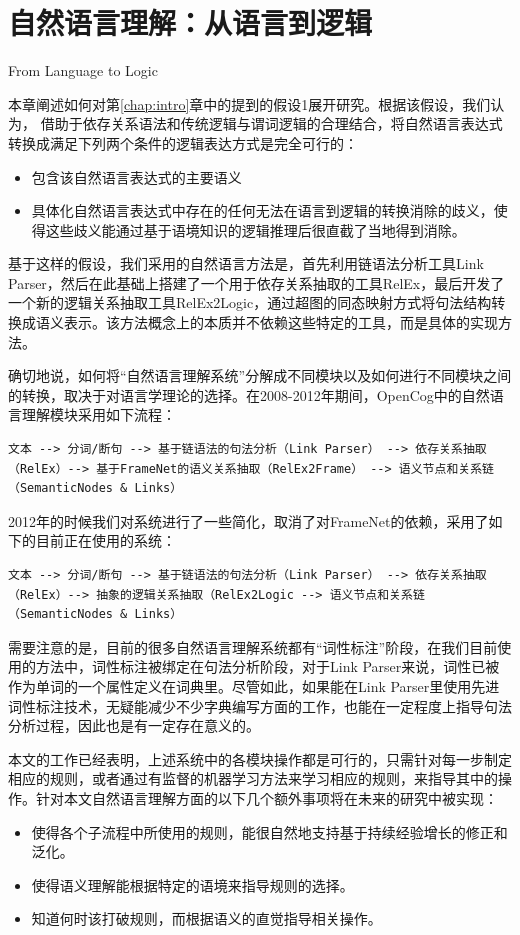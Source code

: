\chapter{自然语言理解：从语言到逻辑}{From Language to Logic}
\label{chap:comprehension}

本章阐述如何对第\ref{chap:intro}章中的提到的假设1展开研究。根据该假设，我们认为， 借助于依存关系语法和传统逻辑与谓词逻辑的合理结合，将自然语言表达式转换成满足下列两个条件的逻辑表达方式是完全可行的：
\begin{itemize}
\item 包含该自然语言表达式的主要语义
\item 具体化自然语言表达式中存在的任何无法在语言到逻辑的转换消除的歧义，使得这些歧义能通过基于语境知识的逻辑推理后很直截了当地得到消除。
\end{itemize}

基于这样的假设，我们采用的自然语言方法是，首先利用链语法分析工具Link Parser\cite{Sleator1993}，然后在此基础上搭建了一个用于依存关系抽取的工具RelEx，最后开发了一个新的逻辑关系抽取工具RelEx2Logic，通过超图的同态映射方式将句法结构转换成语义表示。该方法概念上的本质并不依赖这些特定的工具，而是具体的实现方法。

确切地说，如何将“自然语言理解系统”分解成不同模块以及如何进行不同模块之间的转换，取决于对语言学理论的选择。在2008-2012年期间，OpenCog中的自然语言理解模块采用如下流程：

\begin{verbatim}
文本 --> 分词/断句 --> 基于链语法的句法分析（Link Parser） --> 依存关系抽取（RelEx）--> 基于FrameNet的语义关系抽取（RelEx2Frame） --> 语义节点和关系链（SemanticNodes & Links）
\end{verbatim}

2012年的时候我们对系统进行了一些简化，取消了对FrameNet的依赖，采用了如下的目前正在使用的系统：

\begin{verbatim}
文本 --> 分词/断句 --> 基于链语法的句法分析（Link Parser） --> 依存关系抽取（RelEx）--> 抽象的逻辑关系抽取（RelEx2Logic --> 语义节点和关系链（SemanticNodes & Links）
\end{verbatim}

需要注意的是，目前的很多自然语言理解系统都有“词性标注”阶段，在我们目前使用的方法中，词性标注被绑定在句法分析阶段，对于Link Parser来说，词性已被作为单词的一个属性定义在词典里。尽管如此，如果能在Link Parser里使用先进词性标注技术，无疑能减少不少字典编写方面的工作，也能在一定程度上指导句法分析过程，因此也是有一定存在意义的。

本文的工作已经表明，上述系统中的各模块操作都是可行的，只需针对每一步制定相应的规则，或者通过有监督的机器学习方法来学习相应的规则，来指导其中的操作。针对本文自然语言理解方面的以下几个额外事项将在未来的研究中被实现：
\begin{itemize}
\item 使得各个子流程中所使用的规则，能很自然地支持基于持续经验增长的修正和泛化。
\item 使得语义理解能根据特定的语境来指导规则的选择。
\item 知道何时该打破规则，而根据语义的直觉指导相关操作。
\end{itemize}

